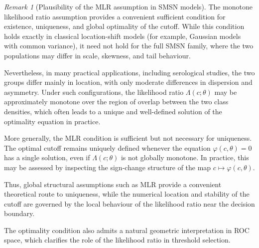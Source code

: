 \documentclass[11pt,a4paper]{article}
\theoremstyle{definition}
\theoremstyle{remark}
\newtheorem{remark}[theorem]{Remark}
\newcommand{\1}{\mathbf{1}}
\begin{document}
\begin{remark}[Plausibility of the MLR assumption in SMSN models]
\label{rem:mlr-sm-sn}
\normalfont
The monotone likelihood ratio assumption provides a convenient
sufficient condition for existence, uniqueness, and global
optimality of the cutoff. While this condition holds exactly in
classical location-shift models (for example, Gaussian models
with common variance), it need not hold for the full SMSN
family, where the two populations may differ in scale,
skewness, and tail behaviour.

Nevertheless, in many practical applications, including
serological studies, the two groups differ mainly in location,
with only moderate differences in dispersion and asymmetry.
Under such configurations, the likelihood ratio
$\Lambda(c;\theta)$ may be approximately monotone over the
region of overlap between the two class densities, which often
leads to a unique and well-defined solution of the optimality
equation in practice.

More generally, the MLR condition is sufficient but not
necessary for uniqueness. The optimal cutoff remains uniquely
defined whenever the equation $\varphi(c,\theta)=0$ has a
single solution, even if $\Lambda(c;\theta)$ is not globally
monotone. In practice, this may be assessed by inspecting the
sign-change structure of the map $c\mapsto\varphi(c,\theta)$.

Thus, global structural assumptions such as MLR provide a
convenient theoretical route to uniqueness, while the numerical
location and stability of the cutoff are governed by the local
behaviour of the likelihood ratio near the decision boundary.
\end{remark}

The optimality condition also admits a natural geometric
interpretation in ROC space, which clarifies the role of the
likelihood ratio in threshold selection.
\end{document}
